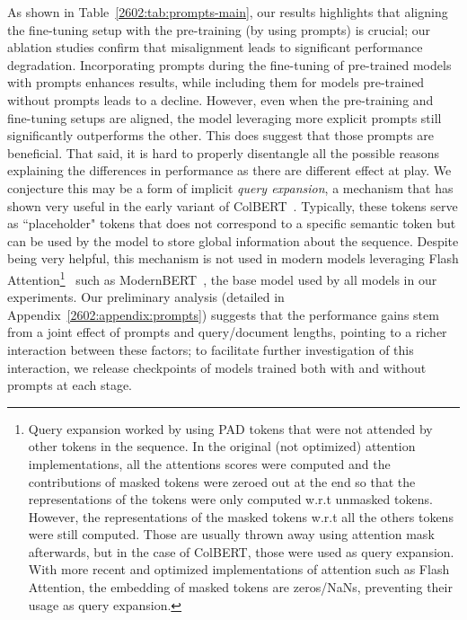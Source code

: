 As shown in Table~\ref{2602:tab:prompts-main}, our results highlights that aligning the fine-tuning setup with the pre-training (by using prompts) is crucial; our ablation studies confirm that misalignment leads to significant performance degradation. Incorporating prompts during the fine-tuning of pre-trained models with prompts enhances results, while including them for models pre-trained without prompts leads to a decline. However, even when the pre-training and fine-tuning setups are aligned, the model leveraging more explicit prompts still significantly outperforms the other. This does suggest that those prompts are beneficial. That said, it is hard to properly disentangle all the possible reasons explaining the differences in performance as there are different effect at play. We conjecture this may be a form of implicit \emph{query expansion}, a mechanism that has shown very useful in the early variant of ColBERT~\cite{khattab2020colbert}. Typically, these tokens serve as ``placeholder" tokens that does not correspond to a specific semantic token but can be used by the model to store global information about the sequence. Despite being very helpful, this mechanism is not used in modern models leveraging Flash Attention\footnote{Query expansion worked by using PAD tokens that were not attended by other tokens in the sequence. In the original (not optimized) attention implementations, all the attentions scores were computed and the contributions of masked tokens were zeroed out at the end so that the representations of the tokens were only computed w.r.t unmasked tokens. However, the representations of the masked tokens w.r.t all the others tokens were still computed. Those are usually thrown away using attention mask afterwards, but in the case of ColBERT, those were used as query expansion. With more recent and optimized implementations of attention such as Flash Attention, the embedding of masked tokens are zeros/NaNs, preventing their usage as query expansion.}~\cite{dao2022flashattention} such as ModernBERT~\cite{warner2025smarter}, the base model used by all models in our experiments. Our preliminary analysis (detailed in Appendix~\ref{2602:appendix:prompts}) suggests that the performance gains stem from a joint effect of prompts and query/document lengths, pointing to a richer interaction between these factors; to facilitate further investigation of this interaction, we release checkpoints of models trained both with and without prompts at each stage.







